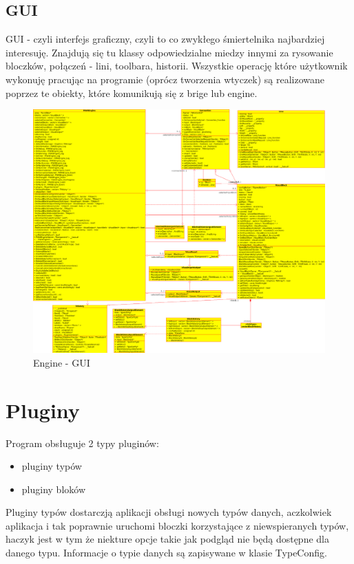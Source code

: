 \subsection{GUI}
GUI - czyli interfejs graficzny, czyli to co zwykłego śmiertelnika najbardziej interesuję. Znajdują się tu klassy odpowiedzialne miedzy innymi za rysowanie bloczków, połączeń - lini, toolbara, historii.
Wszystkie operację które użytkownik wykonuję pracując na programie (oprócz tworzenia wtyczek) są realizowane poprzez te obiekty, które komunikują się z brige lub engine. 
\begin{figure}[h]
 \centering
 \includegraphics[scale=0.3]{diagram-gui.png}
 \caption{Engine - GUI}
 \label{fig:gui}
\end{figure}
\newpage
\section{Pluginy}
Program obsługuje 2 typy pluginów:
\begin{itemize}
\item pluginy typów
\item pluginy bloków
\end{itemize}
Pluginy typów dostarczją aplikacji obsługi nowych typów danych, aczkolwiek aplikacja i tak poprawnie uruchomi bloczki korzystające z niewspieranych typów, haczyk jest w tym że niekture opcje takie jak podgląd nie będą dostępne dla danego typu.
Informacje o typie danych są zapisywane w klasie TypeConfig.\\

